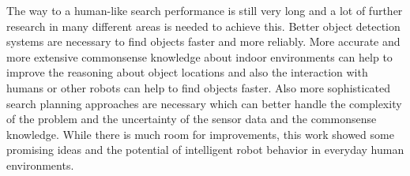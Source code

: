 The way to a human-like search performance is still very long and a lot of further research in many different areas is needed to achieve this. Better object detection systems are necessary to find objects faster and more reliably. More accurate and more extensive commonsense knowledge about indoor environments can help to improve the reasoning about object locations and also the interaction with humans or other robots can help to find objects faster. Also more sophisticated search planning approaches are necessary which can better handle the complexity of the problem and the uncertainty of the sensor data and the commonsense knowledge. While there is much room for improvements, this work showed some promising ideas and the potential of intelligent robot behavior in everyday human environments.